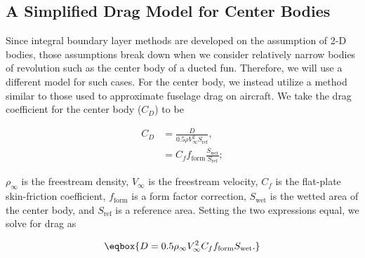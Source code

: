 



\subsection{A Simplified Drag Model for Center Bodies}

Since integral boundary layer methods are developed on the assumption of 2-D bodies, those assumptions break down when we consider relatively narrow bodies of revolution such as the center body of a ducted fun.
%
Therefore, we will use a different model for such cases.
%
For the center body, we instead utilize a method similar to those used to approximate fuselage drag on aircraft.
%
We take the drag coefficient for the center body (\(C_D\)) to be

\begin{equation}
    \begin{aligned}
        C_D &= \frac{D}{0.5 \rho V_\infty^2 S_\text{ref}}, \\
            &= C_f f_\text{form} \frac{S_\text{wet}}{S_\text{ref}};
    \end{aligned}
\end{equation}

\where \(\rho_\infty\) is the freestream density, \(V_\infty\) is the freestream velocity, \(C_f\) is the flat-plate skin-friction coefficient, \(f_\text{form}\) is a form factor correction, \(S_\text{wet}\) is the wetted area of the center body, and \(S_\text{ref}\) is a reference area.
%
Setting the two expressions equal, we solve for drag as

\begin{equation}
    \eqbox{
    D = 0.5 \rho_\infty V_\infty^2 C_f f_\text{form} S_\text{wet}.
}
\end{equation}

